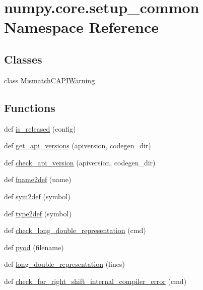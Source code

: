 \hypertarget{namespacenumpy_1_1core_1_1setup__common}{}\section{numpy.\+core.\+setup\+\_\+common Namespace Reference}
\label{namespacenumpy_1_1core_1_1setup__common}
\subsection*{Classes}
\begin{DoxyCompactItemize}
\item 
class \hyperlink{classnumpy_1_1core_1_1setup__common_1_1MismatchCAPIWarning}{Mismatch\+C\+A\+P\+I\+Warning}
\end{DoxyCompactItemize}
\subsection*{Functions}
\begin{DoxyCompactItemize}
\item 
def \hyperlink{namespacenumpy_1_1core_1_1setup__common_a9e469b303019a7d37376a34c8c3be223}{is\+\_\+released} (config)
\item 
def \hyperlink{namespacenumpy_1_1core_1_1setup__common_a0b1b29de059e6a9354d675c1b465b95a}{get\+\_\+api\+\_\+versions} (apiversion, codegen\+\_\+dir)
\item 
def \hyperlink{namespacenumpy_1_1core_1_1setup__common_a0b24934d705a2aa548781667aeab61b5}{check\+\_\+api\+\_\+version} (apiversion, codegen\+\_\+dir)
\item 
def \hyperlink{namespacenumpy_1_1core_1_1setup__common_aa6511dc088d9b283932ed85f6a7ac778}{fname2def} (name)
\item 
def \hyperlink{namespacenumpy_1_1core_1_1setup__common_a4679f39e39e2f5f7dfccc5acfeb29313}{sym2def} (symbol)
\item 
def \hyperlink{namespacenumpy_1_1core_1_1setup__common_aaed884223683ee5875348bccaded9ade}{type2def} (symbol)
\item 
def \hyperlink{namespacenumpy_1_1core_1_1setup__common_a7c0a830f73b42a1d7cb13d71defac25d}{check\+\_\+long\+\_\+double\+\_\+representation} (cmd)
\item 
def \hyperlink{namespacenumpy_1_1core_1_1setup__common_a0335ac177730cff9e8260538e7cb4ec5}{pyod} (filename)
\item 
def \hyperlink{namespacenumpy_1_1core_1_1setup__common_ae7eb2d6700eb4a26ef4b33012b9e2457}{long\+\_\+double\+\_\+representation} (lines)
\item 
def \hyperlink{namespacenumpy_1_1core_1_1setup__common_a64da3d0d4bc2f8f616a7d51f0d788f3c}{check\+\_\+for\+\_\+right\+\_\+shift\+\_\+internal\+\_\+compiler\+\_\+error} (cmd)
\end{DoxyCompactItemize}
